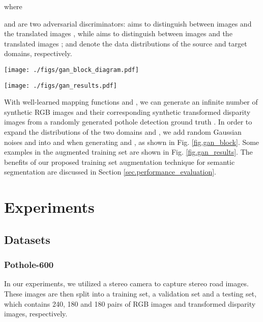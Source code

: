\documentclass[runningheads]{llncs}
\begin{document}
where



 and  are two adversarial discriminators:  aims to distinguish between images  and the translated images , while  aims to distinguish between images  and the translated images ;  and  denote the data distributions of the source and target domains, respectively.

\begin{figure*}[t]
    \centering
    \texttt{[image: ./figs/gan\_block\_diagram.pdf]}
    \caption{Adversarial domain adaptation for training set augmentation.}
    \label{fig.gan_block}
\end{figure*}

\begin{figure*}[t]
    \centering
    \texttt{[image: ./figs/gan\_results.pdf]}
    \caption{Examples of training set augmentation results: (a) randomly created pothole detection ground truth; (b) generated RGB images; and (c) generated transformed disparity images.}
    \label{fig.gan_results}
\end{figure*}

With well-learned mapping functions  and , we can generate an infinite number of synthetic RGB images  and their corresponding synthetic transformed disparity images  from a randomly generated pothole detection ground truth . In order to expand the distributions of the two domains  and , we add random Gaussian noises  and  into  and  when generating  and , as shown in Fig. \ref{fig.gan_block}. Some examples in the augmented training set are shown in Fig. \ref{fig.gan_results}. The benefits of our proposed training set augmentation technique for semantic segmentation are discussed in Section \ref{sec.performance_evaluation}.


\section{Experiments}
\label{sec.exp}

\subsection{Datasets}
\label{sec.datasets}

\subsubsection{Pothole-600}
In our experiments, we utilized a stereo camera to capture stereo road images. These images are then split into a training set, a validation set and a testing set, which contains 240, 180 and 180 pairs of RGB images and transformed disparity images, respectively.
\end{document}
